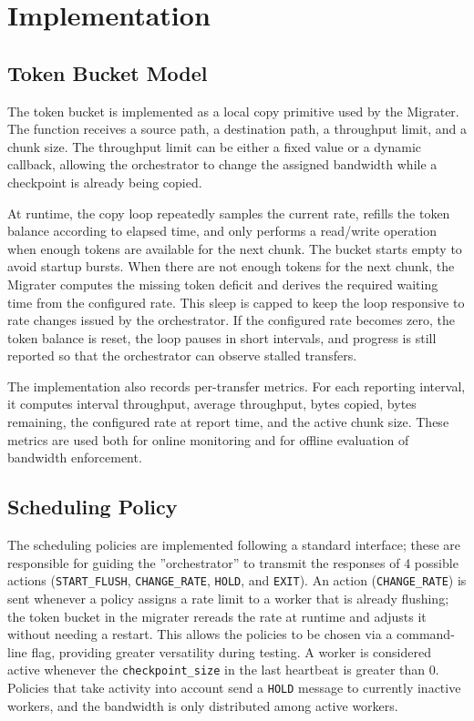 \documentclass[sigplan,twocolumn,10pt,nonacm]{acmart}
\begin{document}
\section{Implementation}

\subsection{Token Bucket Model}

The token bucket is implemented as a local copy primitive used by the Migrater.
The function receives a source path, a destination path, a throughput limit,
and a chunk size. The throughput limit can be either a fixed value or a dynamic
callback, allowing the orchestrator to change the assigned bandwidth while a
checkpoint is already being copied.

At runtime, the copy loop repeatedly samples the current rate, refills the
token balance according to elapsed time, and only performs a read/write
operation when enough tokens are available for the next chunk. The bucket starts
empty to avoid startup bursts. When there are not enough tokens for the next
chunk, the Migrater computes the missing token deficit and derives the required
waiting time from the configured rate. This sleep is capped to keep the loop
responsive to rate changes issued by the orchestrator. If the configured rate
becomes zero, the token balance is reset, the loop pauses in short intervals,
and progress is still reported so that the orchestrator can observe stalled
transfers.

The implementation also records per-transfer metrics. For each reporting
interval, it computes interval throughput, average throughput, bytes copied,
bytes remaining, the configured rate at report time, and the active chunk size.
These metrics are used both for online monitoring and for offline evaluation of
bandwidth enforcement.

\subsection{Scheduling Policy}

The scheduling policies are implemented following a standard interface; these are responsible for guiding the ''orchestrator'' to transmit the responses of 4 possible actions (\texttt{START\_FLUSH}, \texttt{CHANGE\_RATE}, \texttt{HOLD}, and \texttt{EXIT}). An action (\texttt{CHANGE\_RATE}) is sent whenever a policy assigns a rate limit to a worker that is already flushing; the token bucket in the migrater rereads the rate at runtime and adjusts it without needing a restart. This allows the policies to be chosen via a command-line flag, providing greater versatility during testing.
A worker is considered active whenever the \texttt{checkpoint\_size} in the last heartbeat is greater than 0. Policies that take activity into account send a \texttt{HOLD} message to currently inactive workers, and the bandwidth is only distributed among active workers.
\end{document}
